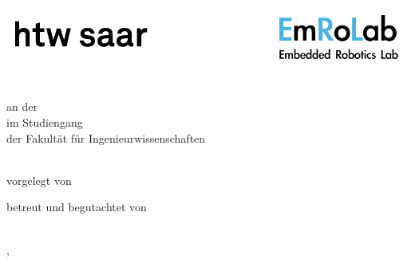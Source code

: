 \begin{titlepage}\linespread{1.5}\selectfont
\includegraphics[scale=1.00]{Graphics/erl_titel_header.pdf}
  \begin{center}
    \large  
    \hfill
    \vfill
    \begingroup
      \Large\bfseries\myDegreeType 
    \endgroup
		
		\bigskip
		
    \myDegree \\ 
    an der \myUni \\
    im Studiengang \myDegreeCourse \\
    der Fakultät für Ingenieurwissenschaften \\ 
    
  \vfill
	
  \begingroup
    \Large\bfseries\myTitle 
  \endgroup
	
	\bigskip
	
  vorgelegt von \\
  \myName
	
  \vfill
	
  betreut und begutachtet von \\
  \myFirstProf \\
	
  \vfill
	
  \myLocation, \myTime                   

    \end{center}       
\end{titlepage}   